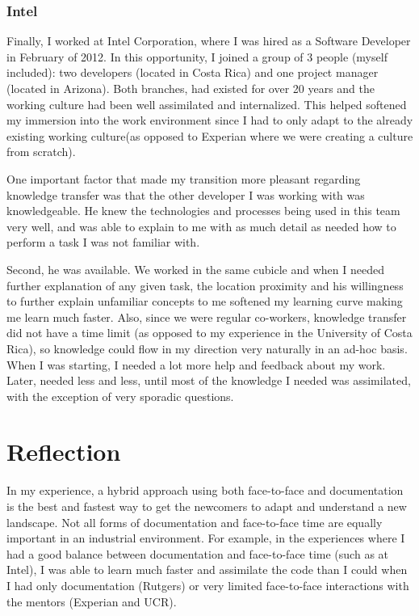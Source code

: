 \documentclass[12pt, letterpaper]{article}
\begin{document}
\subsubsection{Intel}
Finally, I worked at Intel Corporation, where I was hired
as a Software Developer in February of 2012. In this opportunity, I joined a group of 3 people (myself included):
two developers (located in Costa Rica) and one project manager (located in Arizona). Both branches, 
had existed for over 20 years and the working culture had been well assimilated and internalized. 
This helped softened my immersion into the work environment since I had to only adapt to the already
existing working culture(as opposed to Experian where we were creating a culture from scratch).

One important factor that made my transition more pleasant regarding knowledge transfer was that 
the other developer I was working with was knowledgeable. He knew the technologies and processes
being used in this team very well, and was able to explain to me with as much detail as 
needed how to perform a task I was not familiar with. 

Second, he was available. We worked in the same cubicle and when I needed further explanation of any given 
task, the location proximity and his willingness
to further explain unfamiliar concepts to me softened my learning curve making me 
learn much faster. Also, since we were regular co-workers, knowledge transfer did not have a
time limit (as opposed to my experience in the University of Costa Rica), so knowledge could flow in my
direction very naturally in an ad-hoc basis. When I was starting, I needed a lot more help and feedback about my work. 
Later, needed less and less, 
until most of the knowledge I needed was assimilated, with the exception of very sporadic questions. 


\section{Reflection}

In my experience, a hybrid approach using both face-to-face and documentation is 
the best and fastest way to get the newcomers to adapt and understand
a new landscape. Not all forms of documentation and face-to-face time
are equally important in an industrial environment. For example, in the experiences where I had a good balance between documentation and face-to-face time
(such as at Intel), I was able to learn much faster and assimilate the code than I could when
I had only documentation (Rutgers) or very limited face-to-face interactions with the mentors (Experian and 
UCR). 
\end{document}
